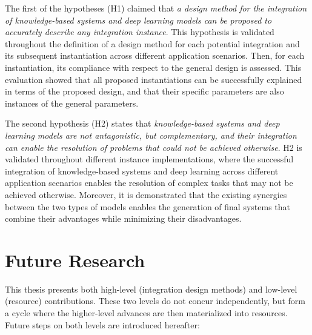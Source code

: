 The first of the hypotheses (H1) claimed that \textit{a design method for the integration of knowledge-based systems and deep learning models can be proposed to accurately describe any integration instance}. This hypothesis is validated throughout the definition of a design method for each potential integration and its subsequent instantiation across different application scenarios. Then, for each instantiation, its compliance with respect to the general design is assessed. This evaluation showed that all proposed instantiations can be successfully explained in terms of the proposed design, and that their specific parameters are also instances of the general parameters. 

The second hypothesis (H2) states that \textit{knowledge-based systems and deep learning models are not antagonistic, but complementary, and their integration can enable the resolution of problems that could not be achieved otherwise}. H2 is validated throughout different instance implementations, where the successful integration of knowledge-based systems and deep learning across different application scenarios enables the resolution of complex tasks that may not be achieved otherwise. Moreover, it is demonstrated that the existing synergies between the two types of models enables the generation of final systems that combine their advantages while minimizing their disadvantages.


\section{Future Research}\label{7_sec:future_research}
This thesis presents both high-level (integration design methods) and low-level (resource) contributions. These two levels do not concur independently, but form a cycle where the higher-level advances are then materialized into resources. Future steps on both levels are introduced hereafter:

